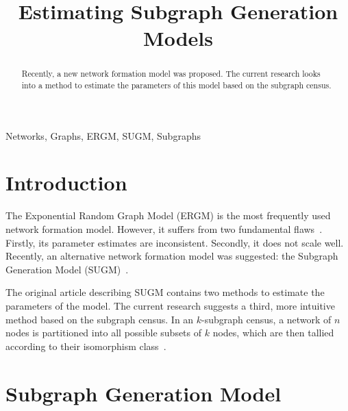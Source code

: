 \documentclass[conference]{IEEEtran}
\begin{document}
\title{Estimating Subgraph Generation Models}

\author{
\and
{}
}

\maketitle

\begin{abstract}
Recently, a new network formation model was proposed. The current research looks into a method to estimate the parameters of this model based on the subgraph census.
\end{abstract}

\begin{IEEEkeywords}
Networks, Graphs, ERGM, SUGM, Subgraphs
\end{IEEEkeywords}

\section{Introduction}

The Exponential Random Graph Model (ERGM) is the most frequently used network formation model. However, it suffers from two fundamental flaws~\cite{Chandrasekhar2014}. Firstly, its parameter estimates are inconsistent. Secondly, it does not scale well. Recently, an alternative network formation model was suggested: the Subgraph Generation Model (SUGM)~\cite{Chandrasekhar2014}.

The original article describing SUGM contains two methods to estimate the parameters of the model. The current research suggests a third, more intuitive method based on the subgraph census. In an $k$-subgraph census, a network of $n$ nodes is partitioned into all possible subsets of $k$ nodes, which are then tallied according to their isomorphism class~\cite{Davis1972}.

\section{Subgraph Generation Model}
\end{document}
